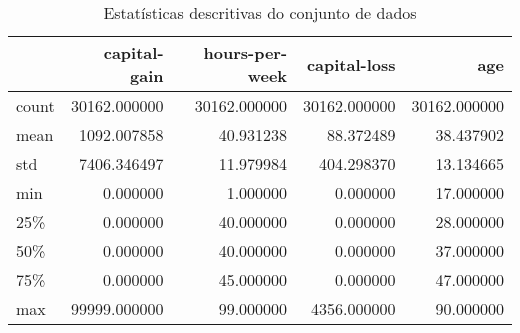 \begin{table}
\centering
\caption{Estatísticas descritivas do conjunto de dados}
\label{tbl:descriptive_statistics}
\begin{tabular}{lrrrr}
\toprule
{} &  capital-gain &  hours-per-week &  capital-loss &           age \\
\midrule
count &  30162.000000 &    30162.000000 &  30162.000000 &  30162.000000 \\
mean  &   1092.007858 &       40.931238 &     88.372489 &     38.437902 \\
std   &   7406.346497 &       11.979984 &    404.298370 &     13.134665 \\
min   &      0.000000 &        1.000000 &      0.000000 &     17.000000 \\
25\%   &      0.000000 &       40.000000 &      0.000000 &     28.000000 \\
50\%   &      0.000000 &       40.000000 &      0.000000 &     37.000000 \\
75\%   &      0.000000 &       45.000000 &      0.000000 &     47.000000 \\
max   &  99999.000000 &       99.000000 &   4356.000000 &     90.000000 \\
\bottomrule
\end{tabular}
\end{table}
